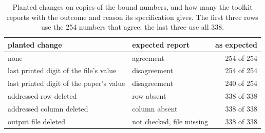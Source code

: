 \vspace{0.5em}
\begin{table}[H]
\centering
\small
\caption{Planted changes on copies of the bound numbers, and how many the toolkit reports with
the outcome and reason its specification gives. The first three rows use the 254 numbers that
agree; the last three use all 338.}
\label{tab:cc-planted}
\begin{tabular}{@{}>{\raggedright\arraybackslash}p{}>{\raggedright\arraybackslash}p{}r@{}}
\toprule
planted change & expected report & as expected \\
\midrule
none & agreement & 254 of 254 \\
last printed digit of the file's value & disagreement & 254 of 254 \\
last printed digit of the paper's value & disagreement & 240 of 254 \\
addressed row deleted & row absent & 338 of 338 \\
addressed column deleted & column absent & 338 of 338 \\
output file deleted & not checked, file missing & 338 of 338 \\
\bottomrule
\end{tabular}
\end{table}
